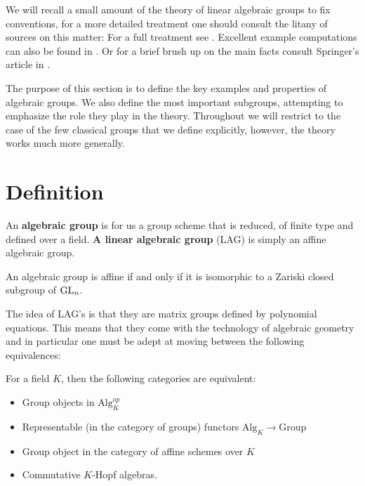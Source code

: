 We will recall a small amount of the theory of linear algebraic groups to fix conventions, for a more detailed treatment one should consult the litany of sources on this matter: For a full treatment see \cite{milneAlgebraicGroupsTheory2017}\cite{milneLieAlgebrasAlgebraic}\cite{milneBasicTheoryAffine2012}\cite{springerLinearAlgebraicGroups1998}. Excellent example computations can also be found in \cite{garrettBuildingsClassicalGroups1997}\cite{makisumiStructureTheoryReductive}\cite{malleLinearAlgebraicGroups2011}. Or for a brief brush up on the main facts consult Springer's article in  \cite[I.I.1]{borelAutomorphicFormsRepresentations1979}. 

The purpose of this section is to define the key examples and properties of algebraic groups. We also define the most important subgroups, attempting to emphasize the role they play in the theory. 
Throughout we will restrict to the case of the few classical groups that we define explicitly, however, the theory works much more generally. 

\section{Definition}
An \textbf{algebraic group} is for us a group scheme that is reduced, of finite type and defined over a field. \textbf{A linear algebraic group} (LAG) is simply an affine algebraic group.

\begin{proposition}
    An algebraic group is affine if and only if it is isomorphic to a Zariski closed subgroup of \(\operatorname{GL}_n\).
\end{proposition}

The idea of LAG's is that they are matrix groups defined by polynomial equations. This means that they come with the technology of algebraic geometry and in particular one must be adept at moving between the following equivalences:
\begin{Theorem}
    For a field \(K\), then the following categories are equivalent:
    \begin{itemize}
        \item Group objects in \(\mathrm{Alg}_K^{op}\)
        \item Representable (in the category of groups) functors \(\mathrm{Alg}_K \to \mathrm{Group}\)
        \item Group object in the category of affine schemes over \(K\)
        \item Commutative \(K\)-Hopf algebras.
    \end{itemize}
\end{Theorem}

